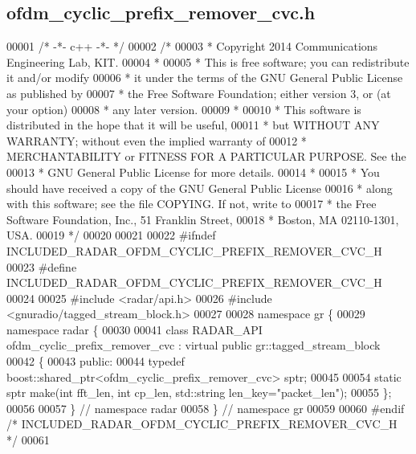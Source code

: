 \subsection{ofdm\+\_\+cyclic\+\_\+prefix\+\_\+remover\+\_\+cvc.\+h}
\label{ofdm__cyclic__prefix__remover__cvc_8h_source}

\begin{DoxyCode}
00001 \textcolor{comment}{/* -*- c++ -*- */}
00002 \textcolor{comment}{/* }
00003 \textcolor{comment}{ * Copyright 2014 Communications Engineering Lab, KIT.}
00004 \textcolor{comment}{ * }
00005 \textcolor{comment}{ * This is free software; you can redistribute it and/or modify}
00006 \textcolor{comment}{ * it under the terms of the GNU General Public License as published by}
00007 \textcolor{comment}{ * the Free Software Foundation; either version 3, or (at your option)}
00008 \textcolor{comment}{ * any later version.}
00009 \textcolor{comment}{ * }
00010 \textcolor{comment}{ * This software is distributed in the hope that it will be useful,}
00011 \textcolor{comment}{ * but WITHOUT ANY WARRANTY; without even the implied warranty of}
00012 \textcolor{comment}{ * MERCHANTABILITY or FITNESS FOR A PARTICULAR PURPOSE.  See the}
00013 \textcolor{comment}{ * GNU General Public License for more details.}
00014 \textcolor{comment}{ * }
00015 \textcolor{comment}{ * You should have received a copy of the GNU General Public License}
00016 \textcolor{comment}{ * along with this software; see the file COPYING.  If not, write to}
00017 \textcolor{comment}{ * the Free Software Foundation, Inc., 51 Franklin Street,}
00018 \textcolor{comment}{ * Boston, MA 02110-1301, USA.}
00019 \textcolor{comment}{ */}
00020 
00021 
00022 \textcolor{preprocessor}{#ifndef INCLUDED\_RADAR\_OFDM\_CYCLIC\_PREFIX\_REMOVER\_CVC\_H}
00023 \textcolor{preprocessor}{#define INCLUDED\_RADAR\_OFDM\_CYCLIC\_PREFIX\_REMOVER\_CVC\_H}
00024 
00025 \textcolor{preprocessor}{#include <radar/api.h>}
00026 \textcolor{preprocessor}{#include <gnuradio/tagged\_stream\_block.h>}
00027 
00028 \textcolor{keyword}{namespace }gr \{
00029   \textcolor{keyword}{namespace }radar \{
00030 
00041     \textcolor{keyword}{class }RADAR_API ofdm_cyclic_prefix_remover_cvc : \textcolor{keyword}{virtual} \textcolor{keyword}{public} gr::tagged\_stream\_block
00042     \{
00043      \textcolor{keyword}{public}:
00044       \textcolor{keyword}{typedef} boost::shared\_ptr<ofdm\_cyclic\_prefix\_remover\_cvc> sptr;
00045 
00054       \textcolor{keyword}{static} sptr make(\textcolor{keywordtype}{int} fft\_len, \textcolor{keywordtype}{int} cp\_len, std::string len\_key=\textcolor{stringliteral}{"packet\_len"});
00055     \};
00056 
00057   \} \textcolor{comment}{// namespace radar}
00058 \} \textcolor{comment}{// namespace gr}
00059 
00060 \textcolor{preprocessor}{#endif }\textcolor{comment}{/* INCLUDED\_RADAR\_OFDM\_CYCLIC\_PREFIX\_REMOVER\_CVC\_H */}\textcolor{preprocessor}{}
00061 
\end{DoxyCode}

